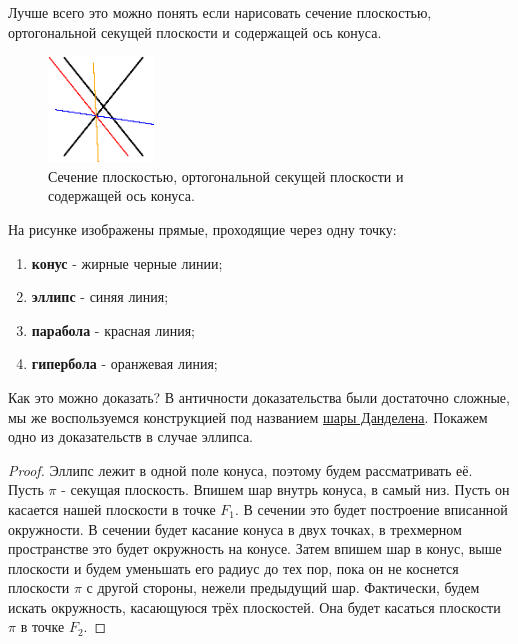 \documentclass[12pt]{article}
\theoremstyle{definition}
\begin{document}
Лучше всего это можно понять если нарисовать сечение плоскостью, ортогональной секущей плоскости и содержащей ось конуса.
\begin{figure}[H]
	\centering
	\includegraphics[width=0.25\textwidth]{ANGL1_8.eps}
	\caption{Сечение плоскостью, ортогональной секущей плоскости и содержащей ось конуса.}
	\label{1_8}
\end{figure}
На рисунке изображены прямые, проходящие через одну точку: 
\begin{enumerate}[label=\arabic*)]
	\item \textbf{конус} - жирные черные линии;
	\item \textbf{эллипс} - синяя линия;
	\item \textbf{парабола} - красная линия;
	\item \textbf{гипербола} - оранжевая линия;
\end{enumerate}
Как это можно доказать? В античности доказательства были достаточно сложные, мы же воспользуемся конструкцией под названием \uline{шары Данделена}. Покажем одно из доказательств в случае эллипса.
\begin{proof}
	Эллипс лежит в одной поле конуса, поэтому будем рассматривать её. Пусть $\pi$ - секущая плоскость. Впишем шар внутрь конуса, в самый низ. Пусть он касается нашей плоскости в точке $F_1$. В сечении это будет построение вписанной окружности. В сечении будет касание конуса в двух точках, в трехмерном пространстве это будет окружность на конусе. Затем впишем шар в конус, выше плоскости и будем уменьшать его радиус до тех пор, пока он не коснется плоскости $\pi$ с другой стороны, нежели предыдущий шар. Фактически, будем искать окружность, касающуюся трёх плоскостей. Она будет  касаться плоскости $\pi$ в точке $F_2$.
\end{proof}
\end{document}
